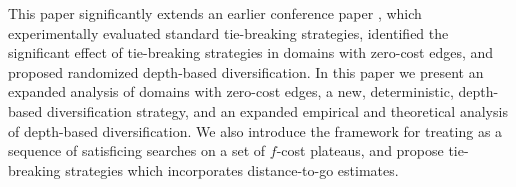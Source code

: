 % 

This paper significantly extends an earlier conference paper \cite{Asai2016}, which experimentally evaluated standard tie-breaking strategies, identified the significant effect of tie-breaking strategies in domains with zero-cost edges, and proposed randomized depth-based diversification.
In this paper we present an expanded analysis of domains with zero-cost edges, a new, deterministic, depth-based diversification strategy, and an expanded empirical and theoretical analysis of depth-based diversification.  We also introduce the 
framework for treating \astar as a sequence of satisficing searches on 
a set of $f$-cost plateaus, and propose tie-breaking strategies which incorporates distance-to-go estimates.
